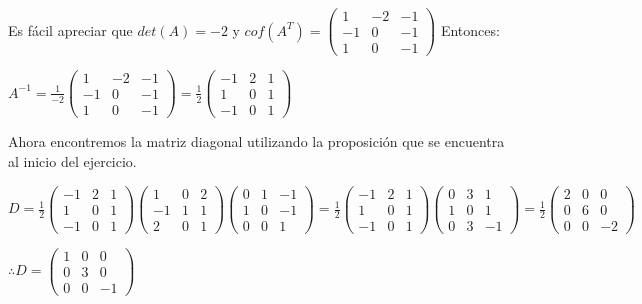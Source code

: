 \documentclass[letterpaper]{article}
\renewcommand{\*}{\cdot}
\theoremstyle{definition}
\begin{document}
	Es fácil apreciar que $det(A)= -2$ y $cof(A^{T})= \begin{pmatrix} 1 & -2 & -1 \\ -1 & 0 & -1 \\ 1 & 0 & -1
	\end{pmatrix}$
	Entonces:
	\begin{center}
		$A^{-1} = \frac{1}{-2}\begin{pmatrix} 1 & -2 & -1 \\ -1 & 0 & -1 \\ 1 & 0 & -1
		\end{pmatrix} = \frac{1}{2}\begin{pmatrix} -1 & 2 & 1 \\ 1 & 0 & 1 \\ -1 & 0 & 1
		\end{pmatrix}$
	\end{center}
	Ahora encontremos la matriz diagonal utilizando la proposición que se encuentra al inicio del ejercicio.
	\begin{center}
		$D = \frac{1}{2}\begin{pmatrix} -1 & 2 & 1 \\ 1 & 0 & 1 \\ -1 & 0 & 1
		\end{pmatrix}\begin{pmatrix} 1 & 0 & 2 \\ -1 & 1 & 1 \\ 2 & 0 & 1
		\end{pmatrix} \begin{pmatrix} 0 & 1 & -1 \\ 1 & 0 & -1 \\ 0 & 0 & 1
		\end{pmatrix} = \frac{1}{2}\begin{pmatrix} -1 & 2 & 1 \\ 1 & 0 & 1 \\ -1 & 0 & 1
		\end{pmatrix}\begin{pmatrix} 0 & 3 & 1 \\ 1 & 0 & 1 \\ 0 & 3 & -1
		\end{pmatrix} = \frac{1}{2}\begin{pmatrix} 2 & 0 & 0 \\ 0 & 6 & 0 \\ 0 & 0 & -2
		\end{pmatrix}$
	\end{center}
	\begin{center}
		$\therefore D = \begin{pmatrix} 1 & 0 & 0 \\ 0 & 3 & 0 \\ 0 & 0 & -1 \end{pmatrix}$
	\end{center}
\end{document}
